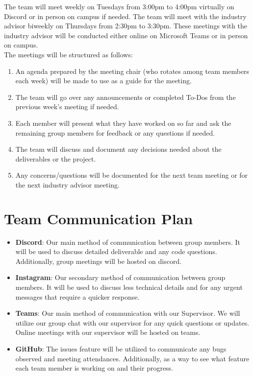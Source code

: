 \documentclass{article}
\begin{document}
The team will meet weekly on Tuesdays from 3:00pm to 4:00pm virtually on Discord or in person on campus if needed. 
The team will meet with the industry advisor biweekly on Thursdays from 2:30pm to 3:30pm. These meetings with the industry advisor will 
be conducted either online on Microsoft Teams or in person on campus. \\[1ex]
The meetings will be structured as follows: 
\begin{enumerate}
	\item An agenda prepared by the meeting chair (who rotates among team members each week) 
  will be made to use as a guide for the meeting.
	\item The team will go over any announcements or completed To-Dos from the previous week's 
  meeting if needed.
  \item Each member will present what they have worked on so far and ask the remaining group 
  members for feedback or any questions if needed.
  \item The team will discuss and document any decisions needed about the deliverables 
  or the project. 
  \item Any concerns/questions will be documented for the next team meeting or for the next 
  industry advisor meeting.
\end{enumerate}

\section{Team Communication Plan}

\begin{itemize}
    \item \textbf{Discord}: Our main method of communication between group members. It will be used to discuss detailed deliverable and any code questions. Additionally, group meetings will be hosted on discord. 
    \item \textbf{Instagram}: Our secondary method of communication between group members. It will be used to discuss less technical details and for any urgent messages that require a quicker response. 
    \item \textbf{Teams}: Our main method of communication with our Supervisor. We will utilize our group chat with our supervisor for any quick questions or updates. Online meetings with our supervisor will be hosted on teams.
    \item \textbf{GitHub}: The issues feature will be utilized to communicate any bugs observed and meeting attendances. Additionally, as a way to see what feature each team member is working on and their progress. 
\end{itemize}
\end{document}
